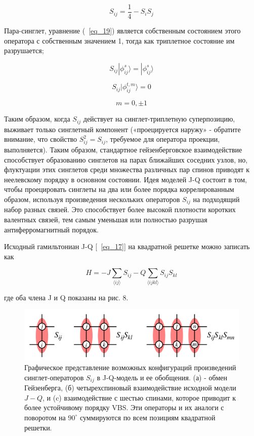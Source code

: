 \documentclass[11pt]{article}
\begin{document}
\begin{equation}
S_{ij} = \frac{1}{4}-S_iS_j
\label{eq_20}
\end{equation}

Пара-синглет, уравнение (~\ref{eq_19}) является собственным состоянием этого оператора с собственным значением 1, тогда как триплетное состояние им разрушается;

\begin{equation*}
S_{ij}|\phi_{ij}^s\rangle = |\phi_{ij}^s\rangle
\end{equation*}

\begin{equation}
S_{ij}|\phi_{ij}^{t,m}\rangle = 0
\label{eq_23}
\end{equation}

\begin{equation*}
m=0, \pm 1
\end{equation*}

Таким образом, когда $S_{ij}$ действует на синглет-триплетную суперпозицию, выживает только синглетный компонент («проецируется наружу» - обратите внимание, что свойство $S_{ij}^2 = S_{ij}$, требуемое для оператора проекции, выполняется). Таким образом, стандартное гейзенберговское взаимодействие способствует образованию синглетов на парах ближайших соседних узлов, но,  флуктуации этих синглетов среди множества различных пар спинов приводят к неелевскому порядку в основном состоянии. Идея моделей J-Q состоит в том, чтобы проецировать синглеты на два или более порядка коррелированным образом, используя произведения нескольких операторов $S_{ij}$ на подходящий набор разных связей. Это способствует более высокой плотности коротких валентных связей, тем самым уменьшая или полностью разрушая антиферромагнитный порядок.

Исходный гамильтониан J-Q [~\ref{eq_17}] на квадратной решетке можно записать как

\begin{equation}
H=-J\sum\limits_{\langle ij \rangle} S_{ij} - Q \sum\limits_{\langle ijkl \rangle}S_{ij}S_{kl}
\label{eq_23}
\end{equation}

где оба члена J и Q показаны на рис. 8. 

\begin{figure}[htp]
\centering
\includegraphics[scale=0.5]{fig8}
\caption{Графическое представление возможных конфигураций произведений  синглет-операторов $S_{ij}$ в J-Q-модель и ее обобщения. (а) - обмен Гейзенберга, (б) четырехспиновый взаимодействие исходной модели $J-Q$, и (c) взаимодействие с шестью спинами, которое приводит к более устойчивому порядку VBS. Эти операторы и их аналоги с поворотом на $90^\circ$ суммируются по всем позициям квадратной решетки.}
\label{}
\end{figure}
\end{document}
